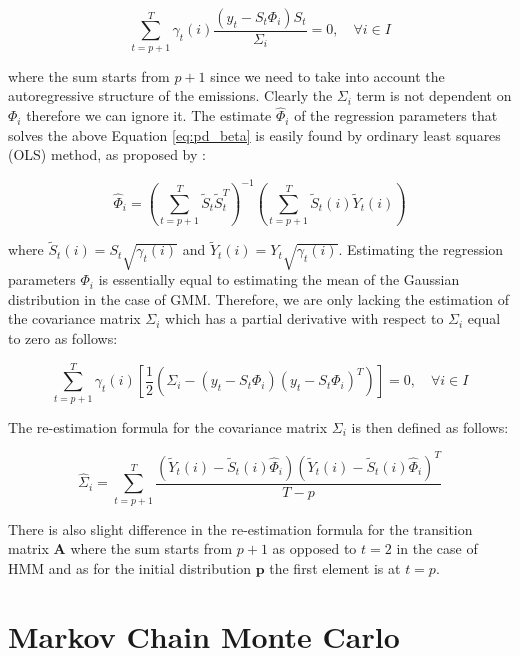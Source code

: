 \begin{equation} \label{eq:pd_beta}
    \sum_{t=p+1}^{T} \gamma_t(i) \frac{(y_t - S_t \Phi_{i})S_t}{\Sigma_i} = 0, \quad \forall i \in I
\end{equation}

where the sum starts from $p+1$ since we need to take into account the autoregressive structure of the emissions. Clearly the $\Sigma_i$ term is not dependent on $\Phi_i$ therefore we can
ignore it. The estimate $\hat{\Phi}_i$ of the regression parameters that solves the above Equation \ref{eq:pd_beta} is easily found by ordinary least squares (OLS) method, as proposed by \citep{Xuan2004}:

\begin{equation}
    \hat{\Phi}_i = \left( \sum_{t=p+1}^{T} \tilde{S}_t \tilde{S}_t^T \right)^{-1} \left( \sum_{t=p+1}^{T} \tilde{S}_t(i) \tilde{Y}_t(i) \right)
\end{equation}

where $\tilde{S}_t(i) = S_t \sqrt{\gamma_t(i)}$ and $\tilde{Y}_t(i) = Y_t \sqrt{\gamma_t(i)}$. Estimating the regression parameters $\Phi_i$ is essentially 
equal to estimating the mean of the Gaussian distribution in the case of GMM. Therefore, we are only lacking the estimation of the covariance matrix $\Sigma_i$
which has a partial derivative with respect to $\Sigma_i$ equal to zero as follows:

\begin{equation} \label{eq:pd_sigma}
    \sum_{t=p+1}^{T} \gamma_t(i) \left[\frac{1}{2} \left(\Sigma_i - (y_t - S_t \Phi_{i})(y_t - S_t \Phi_{i})^T\right) \right] = 0, \quad \forall i \in I
\end{equation}

The re-estimation formula for the covariance matrix $\Sigma_i$ is then defined as follows:

\begin{equation}
    \hat{\Sigma}_i = \sum_{t=p+1}^{T} \frac{\left(\tilde{Y}_t(i) - \tilde{S}_t(i) \hat{\Phi}_i \right) \left(\tilde{Y}_t(i) - \tilde{S}_t(i) \hat{\Phi}_i \right)^T}{T - p}
\end{equation}

There is also slight difference in the re-estimation formula for the transition matrix $\textbf{A}$ where the sum starts from $p+1$ as opposed to $t=2$ in the case of HMM and 
as for the initial distribution $\textbf{p}$ the first element is at $t=p$.~\citep{Xuan2004}

\section{Markov Chain Monte Carlo}~\label{sec:mcmc}

